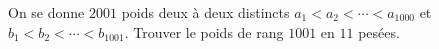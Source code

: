 On se donne $2001$ poids deux à deux distincts $a_1 < a_2 < \cdots < a_{1000}$ et $b_1 < b_2 < \cdots < b_{1001}$. Trouver le poids de rang $1001$ en $11$ pesées.
